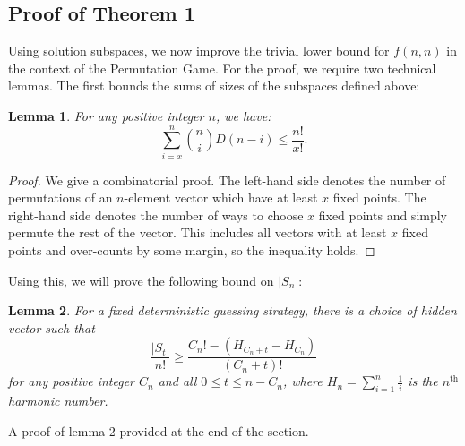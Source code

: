\documentclass[12pt, a4paper]{article}
\newcommand{\nth}{^{\text{th}}}       %
\newtheorem{lemma}{Lemma}
\begin{document}
	\subsection{Proof of Theorem 1}
	Using solution subspaces, we now improve the trivial lower bound for $f(n, n)$ in the context of the Permutation Game. For the proof, we require two technical lemmas. The first bounds the sums of sizes of the subspaces defined above:
		 \begin{lemma}  For any positive integer $n$, we have:
		 	\begin{equation*}
		 	\sum_{i=x}^n\binom{n}{i}D(n-i) \le \frac{n!}{x!}.
		 	\end{equation*}
		 \end{lemma}
		 	\begin{proof}
		 		We give a combinatorial proof. The left-hand side denotes the number of permutations of an $n$-element vector which have at least $x$ fixed points. The right-hand side denotes the number of ways to choose $x$ fixed points and simply permute the rest of the vector. This includes all vectors with at least $x$ fixed points and over-counts by some margin, so the inequality holds.
		 	\end{proof}
		 Using this, we will prove the following bound on $|S_n|$:
		 \begin{lemma} For a fixed deterministic guessing strategy, there is a choice of hidden vector such that 
		 	\begin{equation*}
		 	\frac{|S_t|}{n!}\ge \frac{C_{n}! - (H_{C_{n}+t} - H_{C_{n}})}{(C_n+t)!}
		 	\end{equation*}
		 	for any positive integer $C_n$ and all $0\le t\le n-C_{n}$, where $H_n=\sum_{i = 1}^n\frac{1}{i}$ is the $n\nth$ harmonic number.
		 \end{lemma}
		 A proof of lemma 2 provided at the end of the section.\\
\end{document}
